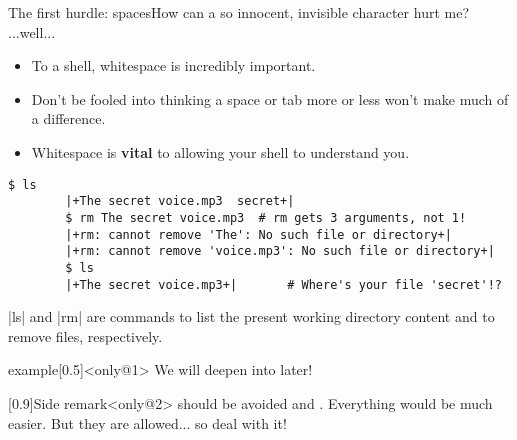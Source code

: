 \begin{frame}[fragile]{The first hurdle: spaces}{How can a so innocent, invisible character hurt me? ...well...}
    \vspace{-3mm}
    \begin{itemize}
        \item To a shell, whitespace is incredibly important.
        \item Don't be fooled into thinking a space or tab more or less won't make much of a difference.
        \item  Whitespace is \textbf{vital} to allowing your shell to understand you. 
    \end{itemize}
    \begin{lstlisting}[style=MyBash, aboveskip=4mm]
        $ ls
        |+The secret voice.mp3  secret+|
        $ rm The secret voice.mp3  # rm gets 3 arguments, not 1!
        |+rm: cannot remove 'The': No such file or directory+|
        |+rm: cannot remove 'voice.mp3': No such file or directory+|
        $ ls
        |+The secret voice.mp3+|       # Where's your file 'secret'!?
    \end{lstlisting}
    \centerline{\ssmall \bash|ls| and \bash|rm| are commands to list the present working directory content and to remove files, respectively.}
    \vspace{-2mm}
    \begin{overlayarea}{\textwidth}{0.3\textheight}
        \begin{varblock}{example}[0.5\textwidth]{}<only@1>
            We will deepen into  later!
        \end{varblock}
        \begin{varblock}{}[0.9\textwidth]{Side remark}<only@2>
             should be avoided and . Everything would be much easier. But they are allowed... so deal with it!
        \end{varblock}
    \end{overlayarea}
\end{frame}
